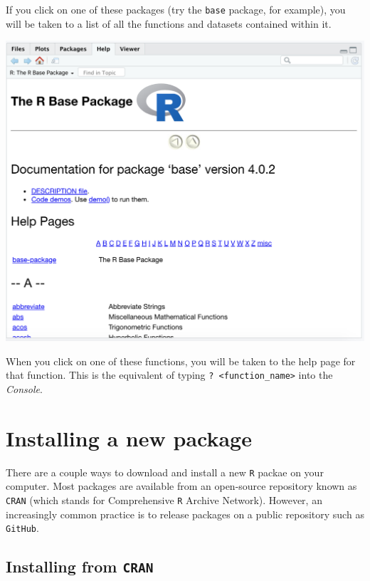 \documentclass[
]{book}
\begin{document}
If you click on one of these packages (try the \texttt{base} package, for example), you will be taken to a list of all the functions and datasets contained within it.

\includegraphics{img/rstudio_base-package.png}

When you click on one of these functions, you will be taken to the help page for that function. This is the equivalent of typing \texttt{?\ \textless{}function\_name\textgreater{}} into the \emph{Console}.

\hypertarget{installing-a-new-package}{%
\section*{Installing a new package}\label{installing-a-new-package}}

There are a couple ways to download and install a new \texttt{R} packae on your computer. Most packages are available from an open-source repository known as \texttt{CRAN} (which stands for Comprehensive \texttt{R} Archive Network). However, an increasingly common practice is to release packages on a public repository such as \texttt{GitHub}.

\hypertarget{installing-from-cran}{%
\subsection*{\texorpdfstring{Installing from \texttt{CRAN}}{Installing from CRAN}}\label{installing-from-cran}}
\end{document}
